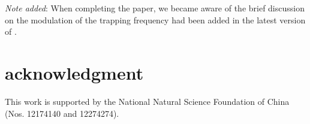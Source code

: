 \documentclass[
aps,
reprint,
superscriptaddress,
amsmath,amssymb,
pra
]{revtex4-2}
\begin{document}
\textit{Note added}: When completing the paper, we became aware of the brief discussion on the modulation of the trapping frequency had been added in the latest version of \cite{2408.06251}.

\section*{acknowledgment}
This work is supported by the National Natural Science Foundation of China (Nos. 12174140 and 12274274).



\end{document}
